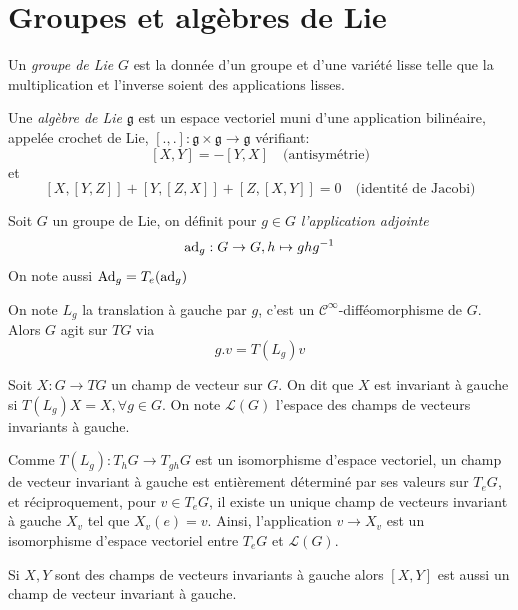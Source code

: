 \documentclass[12pt, a4paper]{book}
\begin{document}
\newpage
\section{Groupes et algèbres de Lie}

\begin{defi}
Un \emph{groupe de Lie} $G$ est la donnée d'un groupe et d'une variété lisse telle que la multiplication et l'inverse soient des applications lisses.
\end{defi}

\begin{defi}
Une \emph{algèbre de Lie} $\mathfrak{g}$ est un espace vectoriel muni d'une application bilinéaire, appelée crochet de Lie, $[.,.] : \mathfrak{g}\times\mathfrak{g} \to \mathfrak{g}$ vérifiant:
$$[X, Y] = - [Y, X] \quad \text{(antisymétrie)}$$
et $$[X, [Y, Z]] + [Y, [Z, X]] + [Z, [X, Y]] = 0 \quad \text{(identité de Jacobi)}$$
\end{defi}

\begin{defi}
Soit $G$ un groupe de Lie, on définit pour $g\in G$ \emph{l'application adjointe} 
$$\operatorname{ad}_g : G \to G, h \mapsto ghg^{-1}$$ 
On note aussi $\operatorname{Ad}_g = T_e(\operatorname{ad}_g)$ \\
\end{defi}

On note $L_g$ la translation à gauche par $g$, c'est un $\mathscr{C}^\infty$-difféomorphisme de $G$. Alors $G$ agit sur $TG$ via 
$$g.v = T(L_g)v$$

\begin{defi}
Soit $X: G \to TG$ un champ de vecteur sur $G$. On dit que $X$ est invariant à gauche si $T(L_g)X = X, \forall g\in G$. On note $\mathcal{L}(G)$ l'espace des champs de vecteurs invariants à gauche.\\
\end{defi}

Comme $T(L_g) : T_hG\to T_{gh}G$ est un isomorphisme d'espace vectoriel, un champ de vecteur invariant à gauche est entièrement déterminé par ses valeurs sur $T_eG$, et réciproquement, pour $v\in T_eG$, il existe un unique champ de vecteurs invariant à gauche $X_v$ tel que $X_v(e)=v$. Ainsi, l'application $v\to X_v$ est un isomorphisme d'espace vectoriel entre $T_eG$ et $\mathcal{L}(G)$. \\

\begin{pro}
Si $X, Y$ sont des champs de vecteurs invariants à gauche alors $[X, Y]$ est aussi un champ de vecteur invariant à gauche. 
\end{pro}
\end{document}
